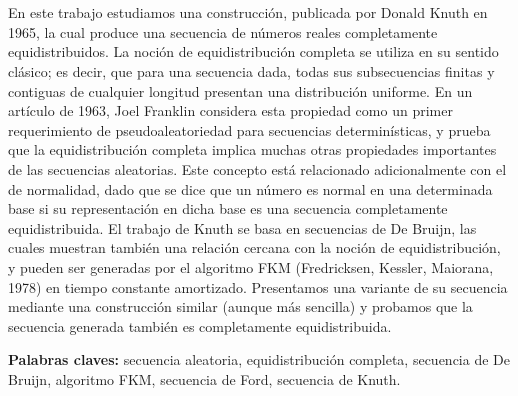 \chapter*{\runtitulo}

\noindent En este trabajo estudiamos una construcción, publicada por Donald Knuth en 1965, la cual produce una secuencia de números reales completamente equidistribuidos. La noción de equidistribución completa se utiliza en su sentido clásico; es decir, que para una secuencia dada, todas sus subsecuencias finitas y contiguas de cualquier longitud presentan una distribución uniforme. En un artículo de 1963, Joel Franklin considera esta propiedad como un primer requerimiento de pseudoaleatoriedad para secuencias determinísticas, y prueba que la equidistribución completa implica muchas otras propiedades importantes de las secuencias aleatorias. Este concepto está relacionado adicionalmente con el de normalidad, dado que se dice que un número es normal en una determinada base si su representación en dicha base es una secuencia completamente equidistribuida. El trabajo de Knuth se basa en secuencias de De Bruijn, las cuales muestran también una relación cercana con la noción de equidistribución, y pueden ser generadas por el algoritmo FKM (Fredricksen, Kessler, Maiorana, 1978) en tiempo constante amortizado. Presentamos una variante de su secuencia mediante una construcción similar (aunque más sencilla) y probamos que la secuencia generada también es completamente equidistribuida.

\bigskip

\noindent\textbf{Palabras claves:} secuencia aleatoria, equidistribución completa, secuencia de De Bruijn, algoritmo FKM, secuencia de Ford, secuencia de Knuth.